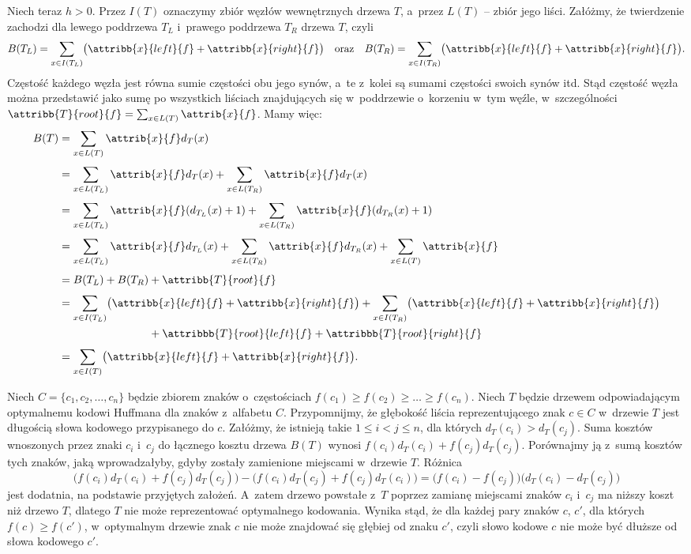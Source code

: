 Niech teraz $h>0$.
Przez $I(T)$ oznaczymy zbiór węzłów wewnętrznych drzewa $T$, a~przez $L(T)$ -- zbiór jego liści.
Załóżmy, że twierdzenie zachodzi dla lewego poddrzewa $T_L$ i~prawego poddrzewa $T_R$ drzewa $T$, czyli
\[
	B(T_L) = \sum_{x\in I(T_L)}\bigl(\attribb{x}{left}{f}+\attribb{x}{right}{f}\bigr) \quad\text{oraz}\quad B(T_R) = \sum_{x\in I(T_R)}\bigl(\attribb{x}{left}{f}+\attribb{x}{right}{f}\bigr).
\]
Częstość każdego węzła jest równa sumie częstości obu jego synów, a~te z~kolei są sumami częstości swoich synów itd.
Stąd częstość węzła można przedstawić jako sumę po wszystkich liściach znajdujących się w~poddrzewie o~korzeniu w~tym węźle, w~szczególności $\attribb{T}{root}{f}=\sum_{x\in L(T)}\attrib{x}{f}$.
Mamy więc:
\begin{align*}
	B(T) &= \sum_{x\in L(T)}\attrib{x}{f}d_T(x) \\[1mm]
	&= \sum_{x\in L(T_L)}\attrib{x}{f}d_T(x)+\sum_{x\in L(T_R)}\attrib{x}{f}d_T(x) \\[1mm]
	&= \sum_{x\in L(T_L)}\attrib{x}{f}(d_{T_L}(x)+1)+\sum_{x\in L(T_R)}\attrib{x}{f}(d_{T_R}(x)+1) \\[1mm]
	&= \sum_{x\in L(T_L)}\attrib{x}{f}d_{T_L}(x)+\sum_{x\in L(T_R)}\attrib{x}{f}d_{T_R}(x)+\sum_{x\in L(T)}\attrib{x}{f} \\[1mm]
	&= B(T_L)+B(T_R)+\attribb{T}{root}{f} \\[1mm]
	&= \sum_{x\in I(T_L)}\bigl(\attribb{x}{left}{f}+\attribb{x}{right}{f}\bigr)+\sum_{x\in I(T_R)}\bigl(\attribb{x}{left}{f}+\attribb{x}{right}{f}\bigr) \\
	& \phantom{{}=B(T_L)+B(T_R)}+\attribbb{T}{root}{left}{f}+\attribbb{T}{root}{right}{f} \\[1mm]
	&= \sum_{x\in I(T)}\bigl(\attribb{x}{left}{f}+\attribb{x}{right}{f}\bigr).
\end{align*}

\exercise %
Niech $C=\{c_1,c_2,\dots,c_n\}$ będzie zbiorem znaków o~częstościach $f(c_1)\ge f(c_2)\ge\dots\ge f(c_n)$.
Niech $T$ będzie drzewem odpowiadającym optymalnemu kodowi Huffmana dla znaków z~alfabetu $C$.
Przypomnijmy, że głębokość liścia reprezentującego znak $c\in C$ w~drzewie $T$ jest długością słowa kodowego przypisanego do $c$.
Załóżmy, że istnieją takie $1\le i<j\le n$, dla których $d_T(c_i)>d_T(c_j)$.
Suma kosztów wnoszonych przez znaki $c_i$ i~$c_j$ do łącznego kosztu drzewa $B(T)$ wynosi $f(c_i)d_T(c_i)+f(c_j)d_T(c_j)$.
Porównajmy ją z~sumą kosztów tych znaków, jaką wprowadzałyby, gdyby zostały zamienione miejscami w~drzewie $T$.
Różnica
\[
	\bigl(f(c_i)d_T(c_i)+f(c_j)d_T(c_j)\bigr)-\bigl(f(c_i)d_T(c_j)+f(c_j)d_T(c_i)\bigr) = \bigl(f(c_i)-f(c_j)\bigr)\bigl(d_T(c_i)-d_T(c_j)\bigr)
\]
jest dodatnia, na podstawie przyjętych założeń.
A~zatem drzewo powstałe z~$T$ poprzez zamianę miejscami znaków $c_i$ i~$c_j$ ma niższy koszt niż drzewo $T$, dlatego $T$ nie może reprezentować optymalnego kodowania.
Wynika stąd, że dla każdej pary znaków $c$, $c'$, dla których $f(c)\ge f(c')$, w~optymalnym drzewie znak $c$ nie może znajdować się głębiej od znaku $c'$, czyli słowo kodowe $c$ nie może być dłuższe od słowa kodowego $c'$.

